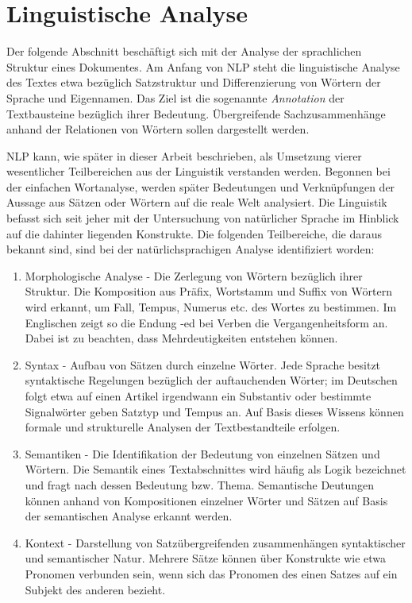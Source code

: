 \documentclass[12pt]{report}
\begin{document}
\section{Linguistische Analyse}
Der folgende Abschnitt beschäftigt sich mit der Analyse der sprachlichen Struktur eines Dokumentes. Am Anfang von NLP steht die linguistische Analyse des Textes etwa bezüglich Satzstruktur und Differenzierung von Wörtern der Sprache und Eigennamen. Das Ziel ist die sogenannte \textit{Annotation} der Textbausteine bezüglich ihrer Bedeutung. Übergreifende Sachzusammenhänge anhand der Relationen von Wörtern sollen dargestellt werden.

NLP kann, wie später in dieser Arbeit beschrieben, als Umsetzung vierer wesentlicher Teilbereichen aus der Linguistik verstanden werden. Begonnen bei der einfachen Wortanalyse, werden später Bedeutungen und Verknüpfungen der Aussage aus Sätzen oder Wörtern auf die reale Welt analysiert. Die Linguistik befasst sich seit jeher mit der Untersuchung von natürlicher Sprache im Hinblick auf die dahinter liegenden Konstrukte. Die folgenden Teilbereiche, die daraus bekannt sind, sind bei der natürlichsprachigen Analyse identifiziert worden:

\begin{enumerate}
\item
Morphologische Analyse - Die Zerlegung von Wörtern bezüglich ihrer Struktur. Die Komposition aus Präfix, Wortstamm und Suffix von Wörtern wird erkannt, um Fall, Tempus, Numerus etc. des Wortes zu bestimmen. Im Englischen zeigt so die Endung -ed bei Verben die Vergangenheitsform an. Dabei ist zu beachten, dass Mehrdeutigkeiten entstehen können.
\item
Syntax - Aufbau von Sätzen durch einzelne Wörter. Jede Sprache besitzt syntaktische Regelungen bezüglich der auftauchenden Wörter; im Deutschen folgt etwa auf einen Artikel irgendwann ein Substantiv oder bestimmte Signalwörter geben Satztyp und Tempus an. Auf Basis dieses Wissens können formale und strukturelle Analysen der Textbestandteile erfolgen.
\item
Semantiken - Die Identifikation der Bedeutung von einzelnen Sätzen und Wörtern. Die Semantik eines Textabschnittes wird häufig als \glqq  Logik\grqq{} bezeichnet und fragt nach dessen Bedeutung bzw. Thema. Semantische Deutungen können anhand von Kompositionen einzelner Wörter und Sätzen auf Basis der semantischen Analyse erkannt werden.
\item
Kontext - Darstellung von Satzübergreifenden zusammenhängen syntaktischer und semantischer Natur. Mehrere Sätze können über Konstrukte wie etwa Pronomen verbunden sein, wenn sich das Pronomen des einen Satzes auf ein Subjekt des anderen bezieht. 
\end{enumerate}
\end{document}
